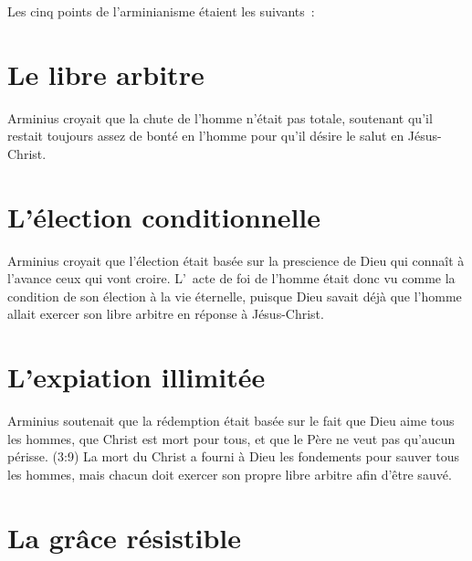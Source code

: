 
Les \Og cinq points de l'arminianisme \Fg{}
 étaient les suivants~:

\section*{Le libre arbitre}

\begin{pocketpar}{}
Arminius croyait que la chute de
 l'homme n'était pas totale,
 soute\-nant qu'il restait toujours assez de bonté en l'homme
 pour qu'il désire le salut en Jésus-Christ.
\end{pocketpar}

\section*{L'élection conditionnelle}

\begin{pocketpar}{}
Arminius croyait que l'élection
 était basée sur la prescience
 de Dieu qui connaît à l'avance ceux qui vont croire.
 L'~\Og acte de foi \Fg{} de l'homme était donc vu comme la \Og condition \Fg{} 
 de son élection à la vie éternelle, puisque Dieu savait déjà
 que l'homme allait exercer son \Og libre arbitre \Fg{}
 en réponse à Jésus-Christ.
\end{pocketpar}

\section*{L'expiation illimitée}

Arminius soutenait que la rédemption était basée sur le fait
 que Dieu aime tous les hom\-mes, que Christ est mort pour tous,
 et que le Père ne veut pas qu'aucun périsse.
 (3:9)
 La mort du Christ a fourni à Dieu les fondements
 pour sauver tous les
 hommes, mais chacun doit exercer son propre
 \Og libre arbitre \Fg{} afin
 d'être sauvé.

\section*{La grâce résistible}

